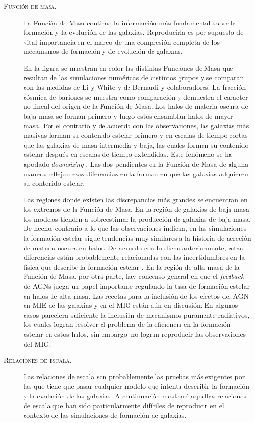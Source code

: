 \documentclass{article}
\begin{document}
\begin{description}
%
\item[\textsc{Función de masa.}] La Función de Masa contiene la información más fundamental sobre la
formación y la evolución de las galaxias. Reproducirla es por supuesto de vital importancia en el
marco de una compresión completa de los mecanismos de formación y de evolución de galaxias.

En la figura se muestran en color las distintas Funciones de Masa que resultan de las simulaciones
numéricas de distintos grupos y se comparan con las medidas de Li y White y de Bernardi y
colaboradores. La fracción cósmica de bariones se muestra como comparación y demuestra el caracter
no lineal del origen de la Función de Masa. Los halos de materia oscura de baja masa se forman
primero y luego estos ensamblan halos de mayor masa. Por el contrario y de acuerdo con las
observaciones, las galaxias más masivas forman su contenido estelar primero y en escalas de tiempo
cortas que las galaxias de masa intermedia y baja, las cuales forman su contenido estelar después en
escalas de tiempo extendidas. Este fenómeno se ha apodado \emph{downsizing} \citep{Cowie1996}. Las
dos pendientes en la Función de Masa de alguna manera reflejan esas diferencias en la forman en que
las galaxias adquieren su contenido estelar.

Las regiones donde existen las discrepancias más grandes se encuentran en los extremos de la Función
de Masa. En la región de galaxias de baja masa los modelos tienden a sobreestimar la producción de
galaxias de baja masa. De hecho, contrario a lo que las observaciones indican, en las simulaciones
la formación estelar sigue tendencias muy similares a la historia de acreción de materia oscura en
halos. De acuerdo con lo dicho anteriormente, estas diferencias están probablemente relacionadas con
las incertidumbres en la física que describe la formación estelar \citep{McKee2007, Krumholz2014}.
En la región de alta masa de la Función de Masa, por otra parte, hay concenso general en que el
\emph{feedback} de AGNs juega un papel importante regulando la tasa de formación estelar en halos de
alta masa. Las recetas para la inclusión de los efectos del AGN en MIE de las galaxias y en el MIG
están aún en discusión. En algunos casos pareciera suficiente la inclusión de mecanismos puramente
radiativos, los cuales logran resolver el problema de la eficiencia en la formación estelar en estos
halos, sin embargo, no logran reproducir las observaciones del MIG.
%
\item[\textsc{Relaciones de escala.}] Las relaciones de escala son probablemente las pruebas más
exigentes por las que tiene que pasar cualquier modelo que intenta describir la formación y la
evolución de las galaxias. A continuación mostraré aquellas relaciones de escala que han sido
particularmente difíciles de reproducir en el contexto de las simulaciones de formación de galaxias.


\end{description}
\end{document}
